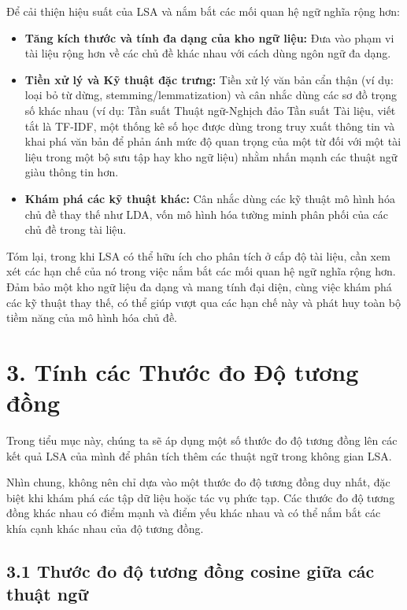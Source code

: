 Để cải thiện hiệu suất của LSA và nắm bắt các mối quan hệ ngữ nghĩa rộng hơn:

\begin{itemize}
  \item \textbf{Tăng kích thước và tính đa dạng của kho ngữ liệu:} Đưa vào phạm vi tài liệu rộng hơn về các chủ đề khác nhau với cách dùng ngôn ngữ đa dạng.
  \item \textbf{Tiền xử lý và Kỹ thuật đặc trưng:} Tiền xử lý văn bản cẩn thận (ví dụ: loại bỏ từ dừng, stemming/lemmatization) và cân nhắc dùng các sơ đồ trọng số khác nhau (ví dụ: Tần suất Thuật ngữ-Nghịch đảo Tần suất Tài liệu, viết tắt là TF-IDF, một thống kê số học được dùng trong truy xuất thông tin và khai phá văn bản để phản ánh mức độ quan trọng của một từ đối với một tài liệu trong một bộ sưu tập hay kho ngữ liệu) nhằm nhấn mạnh các thuật ngữ giàu thông tin hơn.
  \item \textbf{Khám phá các kỹ thuật khác:} Cân nhắc dùng các kỹ thuật mô hình hóa chủ đề thay thế như LDA, vốn mô hình hóa tường minh phân phối của các chủ đề trong tài liệu.
\end{itemize}

Tóm lại, trong khi LSA có thể hữu ích cho phân tích ở cấp độ tài liệu, cần xem xét các hạn chế của nó trong việc nắm bắt các mối quan hệ ngữ nghĩa rộng hơn. Đảm bảo một kho ngữ liệu đa dạng và mang tính đại diện, cùng việc khám phá các kỹ thuật thay thế, có thể giúp vượt qua các hạn chế này và phát huy toàn bộ tiềm năng của mô hình hóa chủ đề.

\section*{3. Tính các Thước đo Độ tương đồng}

Trong tiểu mục này, chúng ta sẽ áp dụng một số thước đo độ tương đồng lên các kết quả LSA của mình để phân tích thêm các thuật ngữ trong không gian LSA.

Nhìn chung, không nên chỉ dựa vào một thước đo độ tương đồng duy nhất, đặc biệt khi khám phá các tập dữ liệu hoặc tác vụ phức tạp. Các thước đo độ tương đồng khác nhau có điểm mạnh và điểm yếu khác nhau và có thể nắm bắt các khía cạnh khác nhau của độ tương đồng.

\subsection*{3.1 Thước đo độ tương đồng cosine giữa các thuật ngữ}

